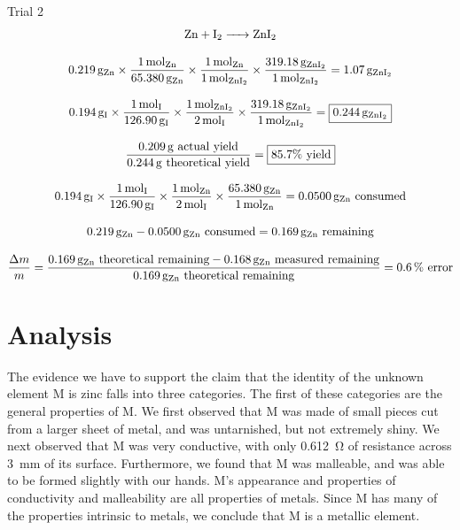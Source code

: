 \documentclass[titlepage]{article}
\begin{document}
\large{Trial 2}
\begin{gather*}
    \ce{Zn + I2 -> ZnI2} \\[2ex]
    \qty{0.219}{\gram\of{Zn}}\times\frac{\qty{1}{\mol\of{Zn}}}{\qty{65.380}{\gram\of{Zn}}}\times\frac{\qty{1}{\mol\of{Zn}}}{\qty{1}{\mol\of{\ce{ZnI2}}}}\times\frac{\qty{319.18}{\gram\of{\ce{ZnI2}}}}{\qty{1}{\mol\of{\ce{ZnI2}}}}=\qty{1.07}{\gram\of{\ce{ZnI2}}} \\[2ex]
    \qty{0.194}{\gram\of{I}}\times\frac{\qty{1}{\mol\of{I}}}{\qty{126.90}{\gram\of{I}}}\times\frac{\qty{1}{\mol\of{\ce{ZnI2}}}}{\qty{2}{\mol\of{I}}}\times\frac{\qty{319.18}{\gram\of{\ce{ZnI2}}}}{\qty{1}{\mol\of{\ce{ZnI2}}}}=\boxed{\qty{0.244}{\gram\of{\ce{ZnI2}}}} \\[2ex]
    \frac{\qty{0.209}{\gram}\mathrm{\ actual\ yield}}{\qty{0.244}{\gram}\mathrm{\ theoretical\ yield}}=\boxed{85.7\unit{\percent}\mathrm{\ yield}} \\[2ex]
    \qty{0.194}{\gram\of{I}}\times\frac{\qty{1}{\mol\of{I}}}{\qty{126.90}{\gram\of{I}}}\times\frac{\qty{1}{\mol\of{Zn}}}{\qty{2}{\mol\of{I}}}\times\frac{\qty{65.380}{\gram\of{Zn}}}{\qty{1}{\mol\of{Zn}}}=\qty{0.0500}{\gram\of{Zn}}\text{ consumed} \\[2ex]
    \qty{0.219}{\gram\of{Zn}}-\qty{0.0500}{\gram\of{Zn}}\text{ consumed}=\qty{0.169}{\gram\of{Zn}}\text{ remaining} \\[2ex]
    \frac{\Delta m}{m}=\frac{\qty{0.169}{\gram\of{Zn}}\text{ theoretical remaining}-\qty{0.168}{\gram\of{Zn}}\text{ measured remaining}}{\qty{0.169}{\gram\of{Zn}}\text{ theoretical remaining}}=\qty{0.6}{\percent}\text{ error}
\end{gather*}

\section{Analysis}

The evidence we have to support the claim that the identity of the unknown element M is zinc falls into three categories. The first of these categories are the general properties of M. We first observed that M was made of small pieces cut from a larger sheet of metal, and was untarnished, but not extremely shiny. We next observed that M was very conductive, with only \qty{0.612}{\ohm} of resistance across \qty{3}{\milli\meter} of its surface. Furthermore, we found that M was malleable, and was able to be formed slightly with our hands. M's appearance and properties of conductivity and malleability are all properties of metals. Since M has many of the properties intrinsic to metals, we conclude that M is a metallic element. 
\end{document}
